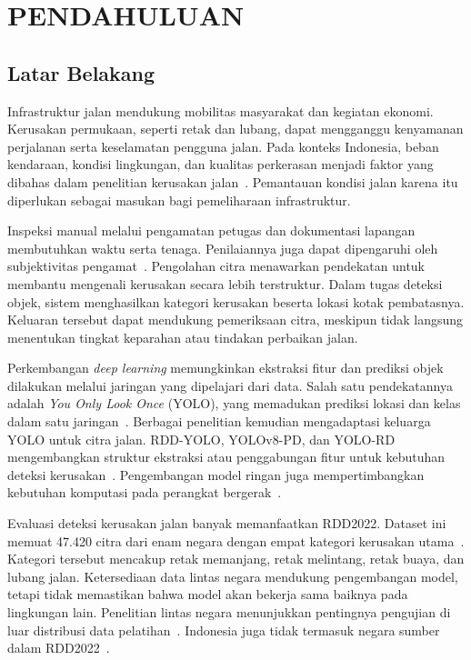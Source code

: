 \chapter{PENDAHULUAN}
\label{bab:pendahuluan}

\section{Latar Belakang}
Infrastruktur jalan mendukung mobilitas masyarakat dan kegiatan ekonomi. Kerusakan permukaan, seperti retak dan lubang, dapat mengganggu kenyamanan perjalanan serta keselamatan pengguna jalan. Pada konteks Indonesia, beban kendaraan, kondisi lingkungan, dan kualitas perkerasan menjadi faktor yang dibahas dalam penelitian kerusakan jalan~\cite{hugo2025efficientdet,kusumah2023deep}. Pemantauan kondisi jalan karena itu diperlukan sebagai masukan bagi pemeliharaan infrastruktur.

Inspeksi manual melalui pengamatan petugas dan dokumentasi lapangan membutuhkan waktu serta tenaga. Penilaiannya juga dapat dipengaruhi oleh subjektivitas pengamat~\cite{Li2024,hugo2025efficientdet}. Pengolahan citra menawarkan pendekatan untuk membantu mengenali kerusakan secara lebih terstruktur. Dalam tugas deteksi objek, sistem menghasilkan kategori kerusakan beserta lokasi kotak pembatasnya. Keluaran tersebut dapat mendukung pemeriksaan citra, meskipun tidak langsung menentukan tingkat keparahan atau tindakan perbaikan jalan.

Perkembangan \textit{deep learning} memungkinkan ekstraksi fitur dan prediksi objek dilakukan melalui jaringan yang dipelajari dari data. Salah satu pendekatannya adalah \textit{You Only Look Once} (YOLO), yang memadukan prediksi lokasi dan kelas dalam satu jaringan~\cite{redmon2016you}. Berbagai penelitian kemudian mengadaptasi keluarga YOLO untuk citra jalan. RDD-YOLO, YOLOv8-PD, dan YOLO-RD mengembangkan struktur ekstraksi atau penggabungan fitur untuk kebutuhan deteksi kerusakan~\cite{Li2024,Zeng2024,Wang2025}. Pengembangan model ringan juga mempertimbangkan kebutuhan komputasi pada perangkat bergerak~\cite{Wu2023}.

Evaluasi deteksi kerusakan jalan banyak memanfaatkan RDD2022. Dataset ini memuat 47.420 citra dari enam negara dengan empat kategori kerusakan utama~\cite{Arya2024846}. Kategori tersebut mencakup retak memanjang, retak melintang, retak buaya, dan lubang jalan. Ketersediaan data lintas negara mendukung pengembangan model, tetapi tidak memastikan bahwa model akan bekerja sama baiknya pada lingkungan lain. Penelitian lintas negara menunjukkan pentingnya pengujian di luar distribusi data pelatihan~\cite{arya2021deep}. Indonesia juga tidak termasuk negara sumber dalam RDD2022~\cite{Arya2024846}.

